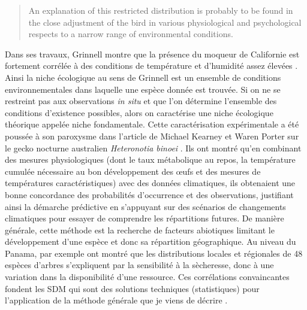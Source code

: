 \begin{quote}
An explanation of this restricted distribution is probably to be found
in the close adjustment of the bird in various physiological and
psychological respects to a narrow range of environmental conditions.
\end{quote}

Dans ses travaux, Grinnell montre que la présence du moqueur de
Californie est fortement corrélée à des conditions de température et
d'humidité assez élevées \citep{Grinnell1917a}. Ainsi la niche
écologique au sens de Grinnell est un ensemble de conditions
environnementales dans laquelle une espèce donnée est trouvée. Si on ne
se restreint pas aux observations \emph{in situ} et que l'on détermine
l'ensemble des conditions d'existence possibles, alors on caractérise
une niche écologique théorique appelée niche fondamentale. Cette
caractérisation expérimentale a été poussée à son paroxysme dans
l'article de Michael Kearney et Waren Porter sur le gecko nocturne
australien \emph{Heteronotia binoei} \citep{Kearney2004}. Ils ont montré
qu'en combinant des mesures physiologiques (dont le taux métabolique au
repos, la température cumulée nécessaire au bon développement des œufs
et des mesures de températures caractéristiques) avec des données
climatiques, ils obtenaient une bonne concordance des probabilités
d'occurrence et des observations, justifiant ainsi la démarche
prédictive en s'appuyant sur des scénarios de changements climatiques
pour essayer de comprendre les répartitions futures. De manière
générale, cette méthode est la recherche de facteurs abiotiques limitant
le développement d'une espèce et donc sa répartition géographique. Au
niveau du Panama, par exemple \citet{Engelbrecht2007} ont montré que les
distributions locales et régionales de 48 espèces d'arbres s'expliquent
par la sensibilité à la sècheresse, donc à une variation dans la
disponibilité d'une ressource. Ces corrélations convaincantes fondent
les SDM qui sont des solutions techniques (statistiques) pour
l'application de la méthode générale que je viens de décrire
\citep{Elith2006, Elith2009a}.

